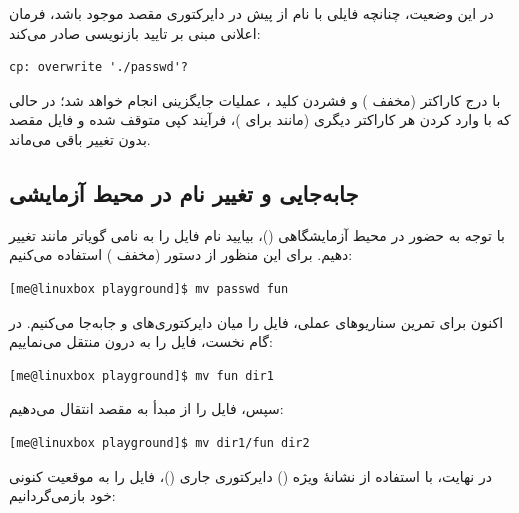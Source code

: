 در این وضعیت، چنانچه فایلی با نام  از پیش در دایرکتوری مقصد موجود باشد، فرمان  اعلانی مبنی بر تایید بازنویسی صادر می‌کند:

\begin{latin}
\begin{lstlisting}
cp: overwrite './passwd'?
\end{lstlisting}
\end{latin}

با درج کاراکتر  (مخفف ) و فشردن کلید ، عملیات جایگزینی انجام خواهد شد؛ در حالی که با وارد کردن هر کاراکتر دیگری (مانند  برای )، فرآیند کپی متوقف شده و فایل مقصد بدون تغییر باقی می‌ماند.

\subsection{جابه‌جایی و تغییر نام در محیط آزمایشی}

با توجه به حضور در محیط آزمایشگاهی ()، بیایید نام فایل  را به نامی گویاتر مانند  تغییر دهیم. برای این منظور از دستور  (مخفف ) استفاده می‌کنیم:

\begin{latin}
\begin{lstlisting}
[me@linuxbox playground]$ mv passwd fun
\end{lstlisting}
\end{latin}

اکنون برای تمرین سناریوهای عملی، فایل  را میان دایرکتوری‌های  و  جابه‌جا می‌کنیم. در گام نخست، فایل را به درون  منتقل می‌نماییم:

\begin{latin}
\begin{lstlisting}
[me@linuxbox playground]$ mv fun dir1
\end{lstlisting}
\end{latin}

سپس، فایل را از مبدأ  به مقصد  انتقال می‌دهیم:

\begin{latin}
\begin{lstlisting}
[me@linuxbox playground]$ mv dir1/fun dir2
\end{lstlisting}
\end{latin}

در نهایت، با استفاده از نشانهٔ ویژه () دایرکتوری جاری ()، فایل را به موقعیت کنونی خود بازمی‌گردانیم:

